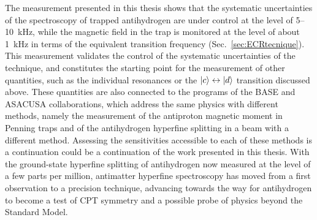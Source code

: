 The measurement presented in this thesis shows that the systematic uncertainties of the spectroscopy of trapped antihydrogen are under control at the level of 5--10~kHz, while the magnetic field in the trap is monitored at the level of about 1~kHz in terms of the equivalent transition frequency (Sec.~\ref{sec:ECRtecnique}). This measurement validates the control of the systematic uncertainties of the technique, and constitutes the starting point for the measurement of other quantities, such as the individual resonances or the $\ket{c} \leftrightarrow \ket{d}$ transition discussed above. These quantities are also connected to the programs of the BASE and ASACUSA collaborations, which address the same physics with different methods, namely the measurement of the antiproton magnetic moment in Penning traps \cite{Smorra2017} and of the antihydrogen hyperfine splitting in a beam \cite{Diermaier:2016fsy,Widmann_2022} with a different method. Assessing the sensitivities accessible to each of these methods is a continuation could be a continuation of the work presented in this thesis. With the ground-state hyperfine splitting of antihydrogen now measured at the level of a few parts per million, antimatter hyperfine spectroscopy has moved from a first observation to a precision technique, advancing towards the way for antihydrogen to become a test of CPT symmetry and a possible probe of physics beyond the Standard Model.

%



